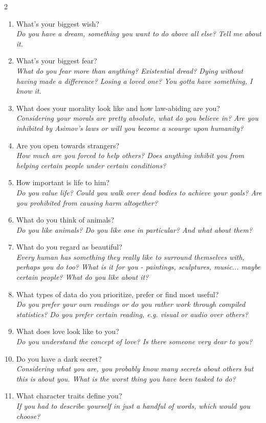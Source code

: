 \documentclass[12pt,a4paper,openany,usenames,dvipsnames]{book}
\begin{document}
\begin{multicols}{2}
\begin{enumerate}
		\textit{You already risked everything going rogue. What made you do it and what would make you do it again?}
		\item What’s your biggest wish?\\
		\textit{Do you have a dream, something you want to do above all else? Tell me about it.}
		\item What’s your biggest fear?\\
		\textit{What do you fear more than anything? Existential dread? Dying without having made a difference? Losing a loved one? You gotta have something, I know it.}
		\item What does your morality look like and how law-abiding are you?\\
		\textit{Considering your morals are pretty absolute, what do you believe in? Are you inhibited by Asimov's laws or will you become a scourge upon humanity?}
		\item Are you open towards strangers?\\
		\textit{How much are you forced to help others? Does anything inhibit you from helping certain people under certain conditions?}
		\item How important is life to him?\\
		\textit{Do you value life? Could you walk over dead bodies to achieve your goals? Are you prohibited from causing harm altogether?}
		\item What do you think of animals?\\
		\textit{Do you like animals? Do you like one in particular? And what about them?}
		\item What do you regard as beautiful?\\
		\textit{Every human has something they really like to surround themselves with, perhaps you do too? What is it for you - paintings, sculptures, music... maybe certain people? What do you like about it?}
		\item What types of data do you prioritize, prefer or find most useful?\\
		\textit{Do you prefer your own readings or do you rather work through compiled statistics? Do you prefer certain reading, e.g. visual or audio over others?}
		\item What does love look like to you?\\
		\textit{Do you understand the concept of love? Is there someone very dear to you?}
		\item Do you have a dark secret?\\
		\textit{Considering what you are, you probably know many secrets about others but this is about you. What is the worst thing you have been tasked to do?}
		\item What character traits define you?\\
		\textit{If you had to describe yourself in just a handful of words, which would you choose?}
	\end{enumerate}
	\end{multicols}
\end{document}
